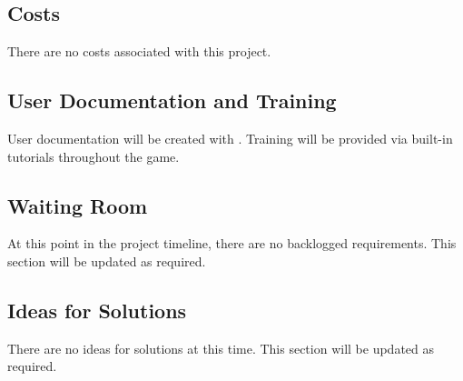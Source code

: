 \documentclass[12pt, titlepage]{article}
\begin{document}
\subsection{Costs}
There are no costs associated with this project.
\subsection{User Documentation and Training}
User documentation will be created with .  Training will be provided via built-in tutorials throughout the game.
\subsection{Waiting Room}
At this point in the project timeline, there are no backlogged requirements.  This section will be updated as required.
\subsection{Ideas for Solutions}
There are no ideas for solutions at this time.  This section will be updated as required.
\end{document}
